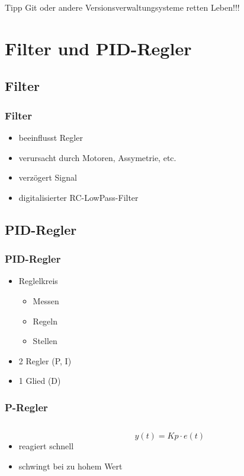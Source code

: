 \documentclass[12pt,a4paper, ngerman]{beamer}
\begin{document}
\begin{frame}
\begin{alertblock}{Tipp}
Git oder andere Versionsverwaltungsysteme retten Leben!!!
\end{alertblock}
\end{frame}

\section{Filter und PID-Regler}
\subsection{Filter}

\begin{frame}
\frametitle{Filter}
\begin{itemize}
\item beeinflusst Regler
\item verursacht durch Motoren, Assymetrie, etc.
\item verzögert Signal
\item digitalisierter RC-LowPass-Filter
\end{itemize}
\end{frame}

\subsection{PID-Regler}

\begin{frame}
\frametitle{PID-Regler}
\begin{itemize}
\item Reglelkreis
	\begin{itemize}
	\item Messen
	\item Regeln
	\item Stellen
	\end{itemize}
\item 2 Regler (P, I)
\item 1 Glied (D)
\end{itemize}
\end{frame}

\begin{frame}
\frametitle{P-Regler}
\begin{columns}
\begin{itemize}
\item reagiert schnell
\item schwingt bei zu hohem Wert
\end{itemize}
\begin{equation*}
y(t)=Kp\cdot e(t)
\end{equation*}
\end{columns}
\end{frame}
\end{document}
